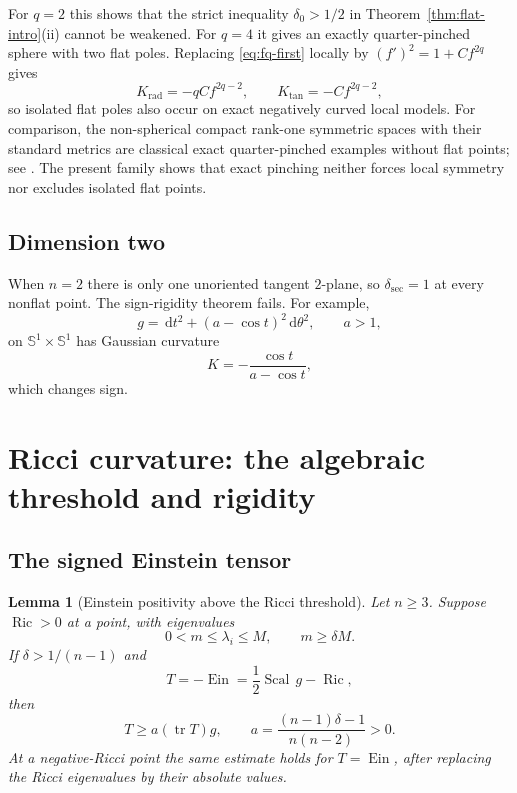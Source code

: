 \documentclass[11pt,reqno]{amsart}
\newtheorem{lemma}[theorem]{Lemma}
\theoremstyle{definition}
\theoremstyle{remark}
\newcommand{\Ric}{\operatorname{Ric}}
\newcommand{\Scal}{\operatorname{Scal}}
\newcommand{\Ein}{\operatorname{Ein}}
\newcommand{\tr}{\operatorname{tr}}
\newcommand{\dd}{\,\mathrm d}
\newcommand{\Sph}{\mathbb S}
\newcommand{\dsec}{\delta_{\mathrm{sec}}}
\begin{document}
For $q=2$ this shows that the strict inequality $\delta_0>1/2$ in Theorem~\ref{thm:flat-intro}(ii) cannot be weakened.  For $q=4$ it gives an exactly quarter-pinched sphere with two flat poles.  Replacing \eqref{eq:fq-first} locally by $(f')^2=1+Cf^{2q}$ gives
\[
K_{\mathrm{rad}}=-qCf^{2q-2},
\qquad
K_{\mathrm{tan}}=-Cf^{2q-2},
\]
so isolated flat poles also occur on exact negatively curved local models.  For comparison, the non-spherical compact rank-one symmetric spaces with their standard metrics are classical exact quarter-pinched examples without flat points; see \cite{Besse}.  The present family shows that exact pinching neither forces local symmetry nor excludes isolated flat points.

\subsection{Dimension two}

When $n=2$ there is only one unoriented tangent $2$-plane, so $\dsec=1$ at every nonflat point.  The sign-rigidity theorem fails.  For example,
\begin{equation}\label{eq:surface-warped}
g=\dd t^2+(a-\cos t)^2\dd\theta^2,
\qquad a>1,
\end{equation}
on $\Sph^1\times\Sph^1$ has Gaussian curvature
\[
K=-\frac{\cos t}{a-\cos t},
\]
which changes sign.

\section{Ricci curvature: the algebraic threshold and rigidity}\label{sec:ricci-rigidity}

\subsection{The signed Einstein tensor}

\begin{lemma}[Einstein positivity above the Ricci threshold]\label{lem:ricci-Ein}
Let $n\ge3$.  Suppose $\Ric>0$ at a point, with eigenvalues
\[
0<m\le\lambda_i\le M,
\qquad m\ge\delta M.
\]
If $\delta>1/(n-1)$ and
\[
T=-\Ein=\frac12\Scal\,g-\Ric,
\]
then
\begin{equation}\label{eq:ricci-a}
T\ge a(\tr T)g,
\qquad
a=\frac{(n-1)\delta-1}{n(n-2)}>0.
\end{equation}
At a negative-Ricci point the same estimate holds for $T=\Ein$, after replacing the Ricci eigenvalues by their absolute values.
\end{lemma}
\end{document}
